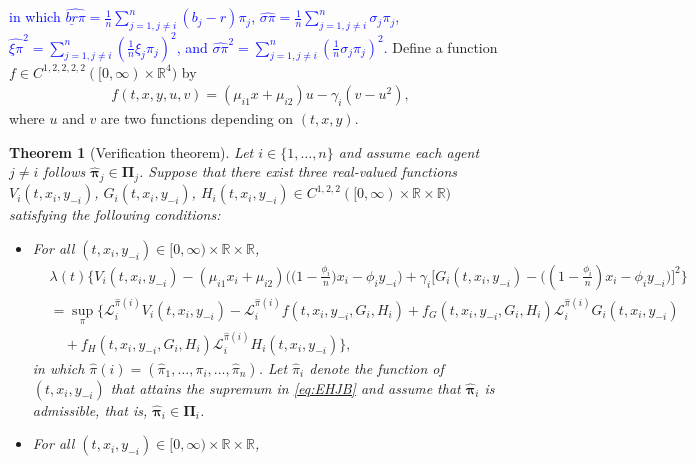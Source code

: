 \documentclass[11pt]{article}
\newtheorem{theorem}{Theorem}[section]
\numberwithin{equation}{section}
\providecommand{\smn}{{-}} %
\begin{document}
\textcolor{blue}{ 	in which  \(\widehat{\underline{br}\pi}=\frac{1}{n}\sum_{j=1, j \neq i}^{n}(b_j - r)\pi_j\),  \(\widehat{\sigma\pi} = \frac{1}{n}\sum_{j=1, j \neq i}^{n}\sigma_j\pi_j\), \(\widehat{\xi\pi}^2 = \sum_{j=1, j \neq i}^{n} \left(\frac{1}{n}\xi_j \pi_j\right)^2\), and \(\widehat{\sigma\pi}^2 = \sum_{j=1, j \neq i}^{n} \left(\frac{1}{n}\sigma_j \pi_j\right)^2\). }
	Define a function \(f \in C^{1,2,2,2,2}([0,\infty) \times \mathbb{R}^4)\) by
	\begin{align}\label{eq:f}
		f(t, x, y, u, v) = (\mu_{i1} x + \mu_{i2}) u - \gamma_i (v - u^2),
	\end{align}
 where $u$ and $v$ are two functions depending on $(t,x,y)$.	
	\begin{theorem}[Verification theorem]\label{th:verification}
Let $i \in \{1, \ldots, n\}$ and assume each agent $j \neq i$ follows $\widehat{\bm{\pi}}_j \in \bm{\Pi}_j$. Suppose that there exist three real-valued functions $V_i(t,x_i,y_{\smn i})$, $G_i(t,x_i,y_{\smn i})$, $H_i(t,x_i,y_{\smn i})\in C^{1,2,2}([0,\infty)\times\mathbb{R}\times\mathbb{R})$ satisfying the following conditions:
		\begin{itemize}
			\item[$(1)$] For all \( (t,x_i,y_{\smn i})\in [0,\infty)\times \mathbb{R}\times \mathbb{R}\),
			\begin{align}
				&\lambda(t)\bigg\{V_i(t,x_i,y_{\smn i})-(\mu_{i1}x_i+\mu_{i2})\Big(\big(1-\frac{\phi_i}{n}\big)x_i-\phi_i y_{\smn i}\Big)+{\gamma_i}\Big[G_i(t,x_i,y_{\smn i})-\Big((1-\frac{\phi_i}{n})x_i-\phi_iy_{\smn i}\Big)\Big]^2\bigg\}\\	&=\sup_{{\pi}}\{\mathcal{L}_i^{\widehat{\pi}(i)}V_i(t,x_i,y_{\smn i})-\mathcal{L}_i^{\widehat{\pi}(i)}f(t,x_i,y_{\smn i},G_i,H_i)+f_G(t,x_i,y_{\smn i},G_i,H_i)\mathcal{L}_i^{\widehat{\pi}(i)} G_i(t,x_i,y_{\smn i})\\
				& \quad +f_H(t,x_i,y_{\smn i},G_i,H_i)\mathcal{L}_i^{\widehat{\pi}(i)}H_i(t,x_i,y_{\smn i})\}, \label{eq:EHJB}
			\end{align}
			in which $\widehat{\pi}(i) = (\widehat{\pi}_1, \ldots, \pi_i, \ldots, \widehat{\pi}_n)$. Let $\widehat{\pi}_i$ denote the function of $(t, x_i, y_{\smn i})$ that attains the supremum in \eqref{eq:EHJB} and assume that $\widehat{\bm{\pi}}_i$ is admissible, that is, $\widehat{\bm{\pi}}_i \in \bm{\Pi}_i$.
			\item[$(2)$] For all \( (t,x_i,y_{\smn i})\in [0,\infty)\times \mathbb{R}\times \mathbb{R}\),
			\begin{align}\label{eq:LG}

\end{align}
\end{itemize}
\end{theorem}
\end{document}
